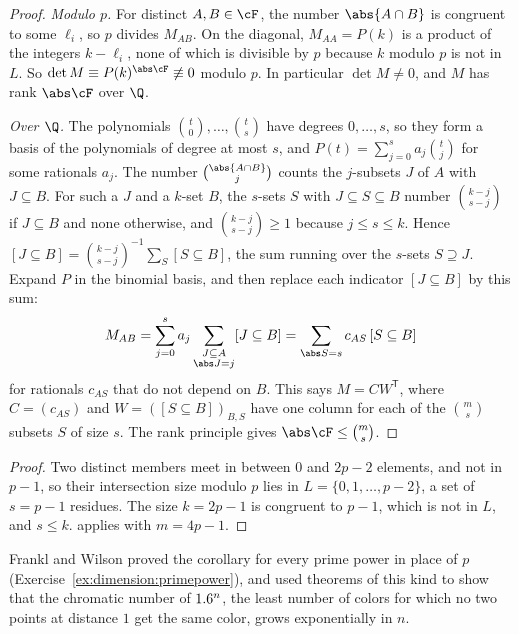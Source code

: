 \begin{refsection}
\begin{proof}
\emph{Modulo $p$.} For distinct $A,B\in\cF$, the number $\abs{A\cap B}$ is congruent to some $\ell_i$, so $p$ divides $M_{AB}$. On the diagonal, $M_{AA}=P(k)$ is a product of the integers $k-\ell_i$, none of which is divisible by $p$ because $k$ modulo $p$ is not in $L$. So $\det M\equiv P(k)^{\abs\cF}\not\equiv0$ modulo $p$. In particular $\det M\ne0$, and $M$ has rank $\abs\cF$ over $\Q$.

\emph{Over $\Q$.} The polynomials $\binom t0,\dots,\binom ts$ have degrees $0,\dots,s$, so they form a basis of the polynomials of degree at most $s$, and $P(t)=\sum_{j=0}^sa_j\binom tj$ for some rationals $a_j$. The number $\binom{\abs{A\cap B}}{j}$ counts the $j$-subsets $J$ of $A$ with $J\subseteq B$. For such a $J$ and a $k$-set $B$, the $s$-sets $S$ with $J\subseteq S\subseteq B$ number $\binom{k-j}{s-j}$ if $J\subseteq B$ and none otherwise, and $\binom{k-j}{s-j}\ge1$ because $j\le s\le k$. Hence $[J\subseteq B]=\binom{k-j}{s-j}^{-1}\sum_{S}[S\subseteq B]$, the sum running over the $s$-sets $S\supseteq J$. Expand $P$ in the binomial basis, and then replace each indicator $[J\subseteq B]$ by this sum:
\[
M_{AB}=\sum_{j=0}^s a_j\sum_{\substack{J\subseteq A\\ \abs J=j}}[J\subseteq B]=\sum_{\abs S=s}c_{AS}\,[S\subseteq B]
\]
for rationals $c_{AS}$ that do not depend on $B$. This says $M=CW^{\mathsf T}$, where $C=(c_{AS})$ and $W=([S\subseteq B])_{B,S}$ have one column for each of the $\binom ms$ subsets $S$ of size $s$. The rank principle gives $\abs\cF\le\binom ms$.
\end{proof}


\begin{proof}
Two distinct members meet in between $0$ and $2p-2$ elements, and not in $p-1$, so their intersection size modulo $p$ lies in $L=\{0,1,\dots,p-2\}$, a set of $s=p-1$ residues. The size $k=2p-1$ is congruent to $p-1$, which is not in $L$, and $s\le k$.  applies with $m=4p-1$.
\end{proof}

Frankl and Wilson proved the corollary for every prime power in place of $p$ (Exercise~\ref{ex:dimension:primepower}), and used theorems of this kind to show that the chromatic number of $1.6^n$, the least number of colors for which no two points at distance $1$ get the same color, grows exponentially in $n$.


\end{refsection}
